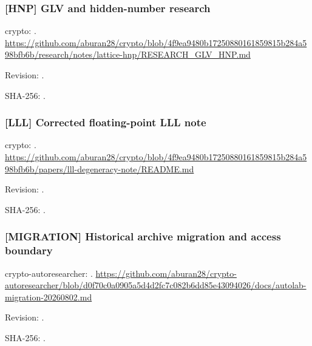 \par\noindent\begin{minipage}{\linewidth}\small
\subsubsection*{[HNP] GLV and hidden-number research}\label{art:HNP}
crypto: .
\url{https://github.com/aburan28/crypto/blob/4f9ea9480b17250880161859815b284a598bfb6b/research/notes/lattice-hnp/RESEARCH_GLV_HNP.md}
\par Revision: .
\par SHA-256: .
\end{minipage}\par\medskip

\par\noindent\begin{minipage}{\linewidth}\small
\subsubsection*{[LLL] Corrected floating-point LLL note}\label{art:LLL}
crypto: .
\url{https://github.com/aburan28/crypto/blob/4f9ea9480b17250880161859815b284a598bfb6b/papers/lll-degeneracy-note/README.md}
\par Revision: .
\par SHA-256: .
\end{minipage}\par\medskip

\par\noindent\begin{minipage}{\linewidth}\small
\subsubsection*{[MIGRATION] Historical archive migration and access boundary}\label{art:MIGRATION}
crypto-autoresearcher: .
\url{https://github.com/aburan28/crypto-autoresearcher/blob/d0f70c0a0905a5d4d2fc7c082b6dd85e43094026/docs/autolab-migration-20260802.md}
\par Revision: .
\par SHA-256: .
\end{minipage}\par\medskip


